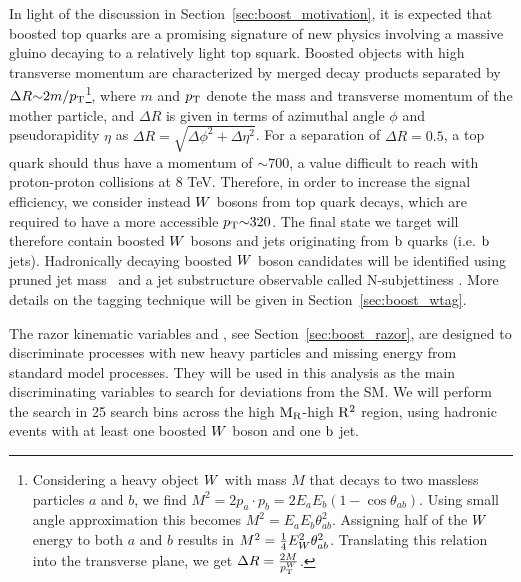 

In light of the discussion in Section~\ref{sec:boost_motivation}, it is expected that boosted top
quarks are a promising signature of new physics involving a massive gluino decaying to a relatively
light top squark.
Boosted objects with high transverse momentum are characterized by merged decay products
separated by $ \Delta R {\sim} 2 m / p_{\mathrm{T}} $\footnote{Considering a heavy object $W$ with mass $M$
that decays to two massless particles $a$ and $b$, we find $M^2 = 2 p_a \cdot p_b = 2 E_a E_b (1
- \cos{\theta_{ab}})$. Using small angle approximation this becomes $M^2 = E_a E_b
\theta_{ab}^2$. Assigning half of the $W$ energy to both $a$ and $b$ results in $M^2 =
\frac{1}{4} E_{W}^2 \theta_{ab}^2$. Translating this relation into the transverse plane, we get
$\Delta R = \frac{2 M}{p_{\mathrm{T}}^{W}}$.}, 
where $m$ and $p_{\mathrm{T}}$ denote the mass and transverse momentum of the mother particle, and $\Delta R$
is given in terms of azimuthal angle $\phi$ and pseudorapidity $\eta$ as $\Delta R = \sqrt{\Delta
\phi^2 + \Delta \eta^2}$.
For a separation of $\Delta R = 0.5$, a top quark should thus have a momentum of ${\sim}700$\GeV, a
value difficult to reach with proton-proton collisions at 8 TeV. Therefore, in order to increase the
signal efficiency, we consider instead $W$ bosons from top quark decays, which are required to have
a more accessible $p_{\mathrm{T}} {\sim} 320$\GeV.  The final state we target will therefore contain boosted
$W$ bosons and jets originating from $\mathrm{b}$ quarks (i.e. $\mathrm{b}$ jets).
Hadronically decaying boosted $W$ boson candidates will be identified using pruned jet
mass~\cite{Ellis:2009su,Ellis:2009me,Chatrchyan:2013vbb} and a jet substructure observable
called N-subjettiness \cite{Thaler:2010tr}. More details on the \W tagging technique will be given
in Section~\ref{sec:boost_wtag}. 

The razor kinematic variables \mr and \rsq, see Section~\ref{sec:boost_razor}, are designed to
discriminate processes with new heavy particles and missing energy from standard model processes.
They will be used in this analysis as the main discriminating variables to search for deviations
from the SM. We will perform the search in 25 search bins across the high $\mathrm{M_R}$-high $\mathrm{R^2}$ region,
using hadronic events with at least one boosted $W$ boson and one $\mathrm{b}$ jet.  

